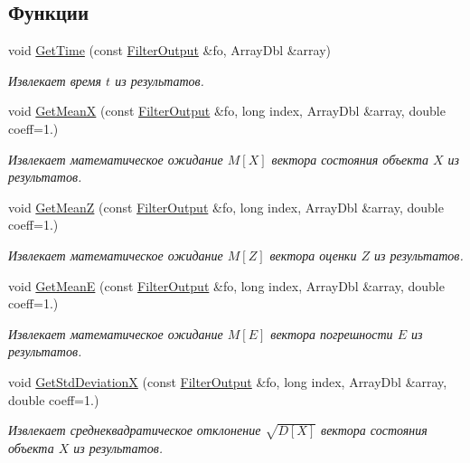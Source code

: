 \subsection*{Функции}
\begin{DoxyCompactItemize}
\item 
void \hyperlink{namespace_core_a90178bb59f67598c08058ad3910d4e0f}{Get\+Time} (const \hyperlink{namespace_core_a60877581a235fc9566087b54d463ce9c}{Filter\+Output} \&fo, Array\+Dbl \&array)
\begin{DoxyCompactList}\small\item\em Извлекает время $t$ из результатов. \end{DoxyCompactList}\item 
void \hyperlink{namespace_core_ae517af0378ac2d5c70c78693f30a49f9}{Get\+MeanX} (const \hyperlink{namespace_core_a60877581a235fc9566087b54d463ce9c}{Filter\+Output} \&fo, long index, Array\+Dbl \&array, double coeff=1.)
\begin{DoxyCompactList}\small\item\em Извлекает математическое ожидание $M[X]$ вектора состояния объекта $X$ из результатов. \end{DoxyCompactList}\item 
void \hyperlink{namespace_core_a865db265ccecab0e64aeb8874d533ff0}{Get\+MeanZ} (const \hyperlink{namespace_core_a60877581a235fc9566087b54d463ce9c}{Filter\+Output} \&fo, long index, Array\+Dbl \&array, double coeff=1.)
\begin{DoxyCompactList}\small\item\em Извлекает математическое ожидание $M[Z]$ вектора оценки $Z$ из результатов. \end{DoxyCompactList}\item 
void \hyperlink{namespace_core_a6b98497b842c1cf15b87ed8d1f839148}{Get\+MeanE} (const \hyperlink{namespace_core_a60877581a235fc9566087b54d463ce9c}{Filter\+Output} \&fo, long index, Array\+Dbl \&array, double coeff=1.)
\begin{DoxyCompactList}\small\item\em Извлекает математическое ожидание $M[E]$ вектора погрешности $E$ из результатов. \end{DoxyCompactList}\item 
void \hyperlink{namespace_core_aec742a92643e69c687aa484cc0c3b0ea}{Get\+Std\+DeviationX} (const \hyperlink{namespace_core_a60877581a235fc9566087b54d463ce9c}{Filter\+Output} \&fo, long index, Array\+Dbl \&array, double coeff=1.)
\begin{DoxyCompactList}\small\item\em Извлекает среднеквадратическое отклонение $\sqrt{D[X]}$ вектора состояния объекта $X$ из результатов. \end{DoxyCompactList}\item 

\end{DoxyCompactItemize}
